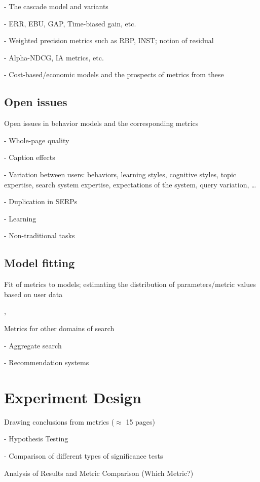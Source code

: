 \documentclass[openany]{now} %
\newcommand{\newpar}{\bigskip\noindent}
\begin{document}
- The cascade model and variants

- ERR, EBU, GAP, Time-biased gain, etc.

- Weighted precision metrics such as RBP, INST; notion of residual

- Alpha-NDCG, IA metrics, etc.

- Cost-based/economic models and the prospects of metrics from these

\section{Open issues}

Open issues in behavior models and the corresponding metrics

- Whole-page quality

- Caption effects

- Variation between users: behaviors, learning styles, cognitive styles, topic expertise, search system expertise, expectations of the system, query variation, \dots

- Duplication in SERPs

- Learning

- Non-traditional tasks

\section{Model fitting}

Fit of metrics to models; estimating the distribution of parameters/metric values based on user data

\cite{CarteretteKY11}, \cite{Moffat2013}

\newpar
Metrics for other domains of search

- Aggregate search \cite{Zhou:2013}

- Recommendation systems \cite{gunawardana2015evaluating}

\chapter{Experiment Design}
\label{c-experiment-design}

Drawing conclusions from metrics (\ensuremath{\approx} 15 pages)

- Hypothesis Testing \cite{Dincer:2014}

- Comparison of different types of significance tests \cite{SmuckerAC09}

\newpar
Analysis of Results and Metric Comparison (Which Metric?)
\end{document}
